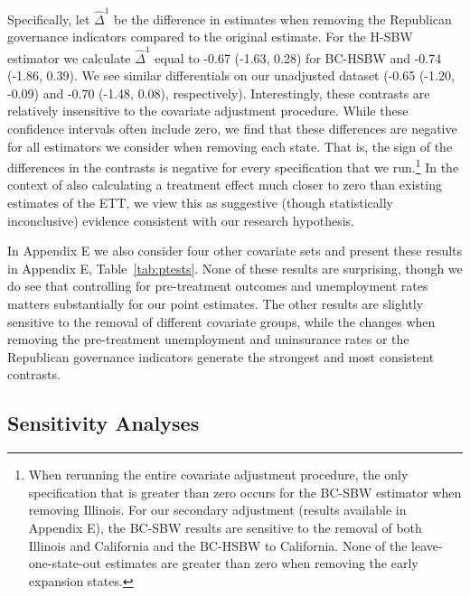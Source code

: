 \documentclass[aoas]{imsart}
\theoremstyle{plain}
\theoremstyle{remark}
\begin{document}
Specifically, let $\hat{\Delta}^1$ be the difference in estimates when removing the Republican governance indicators compared to the original estimate. For the H-SBW estimator we calculate $\hat{\Delta}^1$ equal to -0.67 (-1.63, 0.28) for BC-HSBW and -0.74 (-1.86, 0.39). We see similar differentials on our unadjusted dataset (-0.65 (-1.20, -0.09) and -0.70 (-1.48, 0.08), respectively). Interestingly, these contrasts are relatively insensitive to the covariate adjustment procedure. While these confidence intervals often include zero, we find that these differences are negative for all estimators we consider when removing each state. That is, the sign of the differences in the contrasts is negative for every specification that we run.\footnote{When rerunning the entire covariate adjustment procedure, the only specification that is greater than zero occurs for the BC-SBW estimator when removing Illinois. For our secondary adjustment (results available in Appendix E), the BC-SBW results are sensitive to the removal of both Illinois and California and the BC-HSBW to California. None of the leave-one-state-out estimates are greater than zero when removing the early expansion states.} In the context of also calculating a treatment effect much closer to zero than existing estimates of the ETT, we view this as suggestive (though statistically inconclusive) evidence consistent with our research hypothesis.

In Appendix E we also consider four other covariate sets and present these results in Appendix E, Table~\ref{tab:ptests}. None of these results are surprising, though we do see that controlling for pre-treatment outcomes and unemployment rates matters substantially for our point estimates. The other results are slightly sensitive to the removal of different covariate groups, while the changes when removing the pre-treatment unemployment and uninsurance rates or the Republican governance indicators generate the strongest and most consistent contrasts. 

\subsection{Sensitivity Analyses} \label{sssec:sensitivity}
\end{document}

